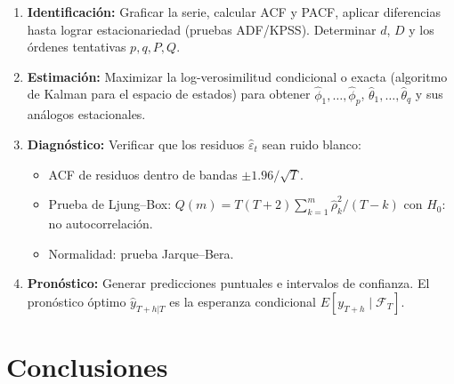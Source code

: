 \documentclass[12pt,a4paper]{article}
\begin{document}
\begin{enumerate}[label=\textbf{\arabic*.}, leftmargin=*]
  \item \textbf{Identificaci{\'o}n:} Graficar la serie, calcular ACF y PACF,
        aplicar diferencias hasta lograr estacionariedad (pruebas ADF/KPSS).
        Determinar $d$, $D$ y los {\'o}rdenes tentativas $p,q,P,Q$.

  \item \textbf{Estimaci{\'o}n:} Maximizar la log-verosimilitud condicional o exacta
        (algoritmo de Kalman para el espacio de estados) para obtener
        $\hat{\phi}_1,\ldots,\hat{\phi}_p$, $\hat{\theta}_1,\ldots,\hat{\theta}_q$
        y sus an{\'a}logos estacionales.

  \item \textbf{Diagn{\'o}stico:} Verificar que los residuos $\hat{\varepsilon}_t$
        sean ruido blanco:
        \begin{itemize}
          \item ACF de residuos dentro de bandas $\pm 1.96/\sqrt{T}$.
          \item Prueba de Ljung--Box: $Q(m) = T(T+2)\sum_{k=1}^{m}\hat{\rho}_k^2/(T-k)$
                con $H_0$: no autocorrelaci{\'o}n.
          \item Normalidad: prueba Jarque--Bera.
        \end{itemize}

  \item \textbf{Pron{\'o}stico:} Generar predicciones puntuales e intervalos de confianza.
        El pron{\'o}stico {\'o}ptimo $\hat{y}_{T+h|T}$ es la esperanza condicional
        $E[y_{T+h}\mid \mathcal{F}_T]$.
\end{enumerate}

\section{Conclusiones}
\end{document}
